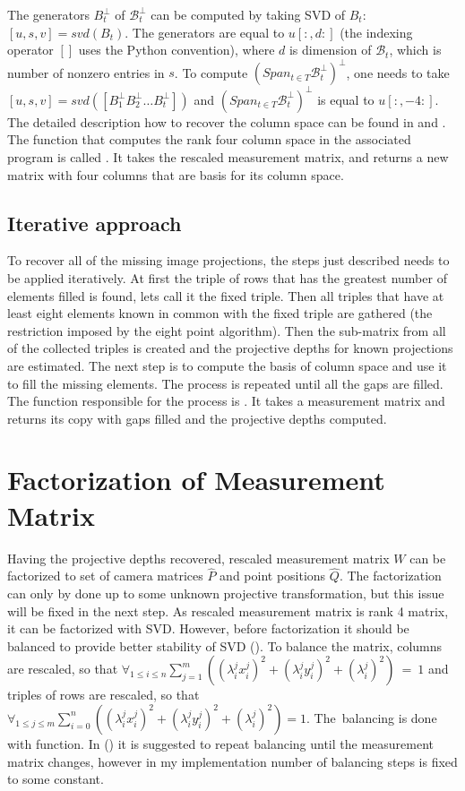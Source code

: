 \documentclass[12pt]{article}
\begin{document}
The generators $B_t^\bot$ of $\mathcal{B}_t^\bot$ can be computed by taking SVD
of $B_t$: $[u, s, v] = svd(B_t)$. The generators are equal to $u[:, d:]$
(the indexing operator $[]$ uses the Python convention), where $d$ is dimension of
$\mathcal{B}_t$, which is number of nonzero entries in $s$. To compute $(Span_{t
\in T} \mathcal{B}_t^\bot)^\bot$, one needs to take $[u, s, v] = svd([B_1^\bot
B_2^\bot \dots B_t^\bot])$ and $(Span_{t \in T} \mathcal{B}_t^\bot)^\bot$ is
equal to $u[:, -4:]$. The detailed description how to recover the column space
can be found in \cite{jacobs99} and \cite{svoboda04}. The function that computes
the rank four column space in the associated program is called
. It takes the rescaled measurement matrix, and
returns a new matrix with four columns that are basis for its column space.

\subsection{Iterative approach}

To recover all of the missing image projections, the
steps just described needs to be applied iteratively. At first the triple of
rows that has the greatest number of elements filled is found, lets call it the
fixed triple. Then all triples that have at least eight elements known in common
with the fixed triple are gathered (the restriction imposed by the eight point
algorithm). Then the sub-matrix from all of the collected triples is created and
the projective depths for known projections are estimated. The next step is to
compute the basis of column space and use it to fill the missing elements. The
process is repeated until all the gaps are filled. The function responsible for
the process is . It takes a measurement matrix
 and returns its copy with gaps filled and the projective depths
computed.

\section{Factorization of Measurement Matrix}

Having the projective depths
recovered, rescaled measurement matrix $W$ can be factorized to set of camera
matrices $\hat{P}$ and point positions $\hat{Q}$. The factorization can only by
done up to some unknown projective transformation, but this issue will be fixed
in the next step. As rescaled measurement matrix is rank 4 matrix, it can be
factorized with SVD. However, before factorization it should be balanced to
provide better stability of SVD (\cite{sturm96}). To balance the matrix, columns
are rescaled, so that $\forall_{1 \leq i \leq n} \sum_{j=1}^m \left( (\lambda
_i^j x_i^j)^2 + (\lambda _i^j y_i^j)^2 + (\lambda _i^j)^2 \right)~=~1$ and
triples of rows are rescaled, so that $\forall_{1 \leq j \leq m} \sum_{i=0}^n
\left( (\lambda _i^j x_i^j)^2 + (\lambda _i^j y_i^j)^2 + (\lambda _i^j)^2
\right) = 1$. The~balancing is done with 
function. In (\cite{sturm96}) it is suggested to repeat balancing until the
measurement matrix  changes, however in my implementation number of balancing
steps is fixed to some constant.
\end{document}

